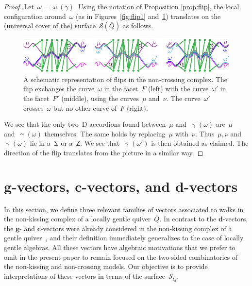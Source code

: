\documentclass{amsart}
\theoremstyle{definition}
\renewcommand{\b}[1]{\mathbf{#1}} %
\newcommand{\walk}{\operatorname{\omega}} %
\newcommand{\surface}{\mathcal{S}} %
\newcommand{\dissection}{\mathrm{D}} %
\newcommand{\curveof}{\operatorname{\gamma}} %
\DeclareRobustCommand{\SSS}{\reflectbox{$\mathsf{Z}$}} %
\DeclareRobustCommand{\ZZZ}{\mathsf{Z}} %
\begin{document}
\begin{proof}
Let~$\omega = \walk(\gamma)$.  Using the notation of Proposition \ref{prop:flip}, the local configuration around~$\omega$ (as in Figures~\ref{fig:flip1} and~\ref{fig:flip2}) translates on the (universal cover of the) surface~$\surface(\bar Q)$ as follows.
%
\begin{figure}[h]
	\capstart
	\centerline{\includegraphics[scale=1]{flip2}}
	\caption{A schematic representation of flips in the non-crossing complex. The flip exchanges the curve~$\omega$ in the facet~$F$ (left) with the curve~$\omega'$ in the facet~$F'$ (middle), using the curves~$\mu$ and~$\nu$. The curve~$\omega'$ crosses~$\omega$ but no other curve of~$F$ (right).}
	\label{fig:flip2}
\end{figure}
%
We see that the only two~$\dissection$-accordions found between~$\mu$ and~$\curveof(\omega)$ are~$\mu$ and~$\curveof(\omega)$ themselves.
The same holds by replacing~$\mu$ with~$\nu$.
Thus~$\mu, \nu$ and~$\curveof(\omega)$ lie in a~$\SSS$ or a~$\ZZZ$.
%
We see that~$\curveof(\omega')$ is then obtained as claimed. The direction of the flip translates from the picture in a similar way.
\end{proof}




\section{$\b{g}$-vectors, $\b{c}$-vectors, and $\b{d}$-vectors}
\label{sec:vectors}

In this section, we define three relevant families of vectors associated to walks in the non-kissing complex of a locally gentle quiver~$\bar Q$.
In contrast to the $\b{d}$-vectors, the $\b{g}$- and $\b{c}$-vectors were already considered in the non-kissing complex of a gentle quiver~\cite[Sect.~4.2]{PaluPilaudPlamondon}, and their definition immediately generalizes to the case of locally gentle algebras.
All these vectors have algebraic motivations that we prefer to omit in the present paper to remain focused on the two-sided combinatorics of the non-kissing and non-crossing models.
Our objective is to provide interpretations of these vectors in terms of the surface~$\surface_{\bar Q}$.
\end{document}
